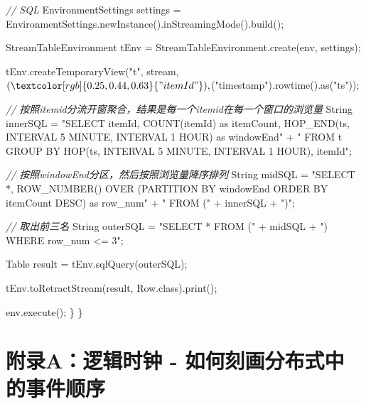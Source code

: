 \documentclass[cn,11pt,chinese]{elegantbook}
\newenvironment{Shaded}{}{}
\newcommand{\BuiltInTok}[1]{#1}
\newcommand{\CommentTok}[1]{\textcolor[rgb]{0.38,0.63,0.69}{\textit{#1}}}
\newcommand{\FunctionTok}[1]{\textcolor[rgb]{0.02,0.16,0.49}{#1}}
\newcommand{\NormalTok}[1]{#1}
\newcommand{\StringTok}[1]{\textcolor[rgb]{0.25,0.44,0.63}{#1}}
\begin{document}
\begin{Shaded}
\begin{Highlighting}[]
        \CommentTok{// SQL}
\NormalTok{        EnvironmentSettings settings = EnvironmentSettings.}\FunctionTok{newInstance}\NormalTok{().}\FunctionTok{inStreamingMode}\NormalTok{().}\FunctionTok{build}\NormalTok{();}

\NormalTok{        StreamTableEnvironment tEnv = StreamTableEnvironment.}\FunctionTok{create}\NormalTok{(env, settings);}

\NormalTok{        tEnv.}\FunctionTok{createTemporaryView}\NormalTok{(}\StringTok{"t"}\NormalTok{, stream, $(}\StringTok{"itemId"}\NormalTok{), $(}\StringTok{"timestamp"}\NormalTok{).}\FunctionTok{rowtime}\NormalTok{().}\FunctionTok{as}\NormalTok{(}\StringTok{"ts"}\NormalTok{));}

        \CommentTok{// 按照itemid分流开窗聚合，结果是每一个itemid在每一个窗口的浏览量}
        \BuiltInTok{String}\NormalTok{ innerSQL = }\StringTok{"SELECT itemId, COUNT(itemId) as itemCount, HOP\_END(ts, INTERVAL \textquotesingle{}5\textquotesingle{} MINUTE, INTERVAL \textquotesingle{}1\textquotesingle{} HOUR) as windowEnd"}\NormalTok{ +}
                \StringTok{" FROM t GROUP BY HOP(ts, INTERVAL \textquotesingle{}5\textquotesingle{} MINUTE, INTERVAL \textquotesingle{}1\textquotesingle{} HOUR), itemId"}\NormalTok{;}

        \CommentTok{// 按照windowEnd分区，然后按照浏览量降序排列}
        \BuiltInTok{String}\NormalTok{ midSQL = }\StringTok{"SELECT *, ROW\_NUMBER() OVER (PARTITION BY windowEnd ORDER BY itemCount DESC) as row\_num"}\NormalTok{ +}
                \StringTok{" FROM ("}\NormalTok{ + innerSQL + }\StringTok{")"}\NormalTok{;}

        \CommentTok{// 取出前三名}
        \BuiltInTok{String}\NormalTok{ outerSQL = }\StringTok{"SELECT * FROM ("}\NormalTok{ + midSQL + }\StringTok{") WHERE row\_num \textless{}= 3"}\NormalTok{;}

\NormalTok{        Table result = tEnv.}\FunctionTok{sqlQuery}\NormalTok{(outerSQL);}

\NormalTok{        tEnv.}\FunctionTok{toRetractStream}\NormalTok{(result, Row.}\FunctionTok{class}\NormalTok{).}\FunctionTok{print}\NormalTok{();}

\NormalTok{        env.}\FunctionTok{execute}\NormalTok{();}
\NormalTok{    \}}
\NormalTok{\}}
\end{Highlighting}
\end{Shaded}

\hypertarget{ux9644ux5f55aux903bux8f91ux65f6ux949f---ux5982ux4f55ux523bux753bux5206ux5e03ux5f0fux4e2dux7684ux4e8bux4ef6ux987aux5e8f}{%
\chapter{附录A：逻辑时钟 -
如何刻画分布式中的事件顺序}\label{ux9644ux5f55aux903bux8f91ux65f6ux949f---ux5982ux4f55ux523bux753bux5206ux5e03ux5f0fux4e2dux7684ux4e8bux4ef6ux987aux5e8f}}
\end{document}

